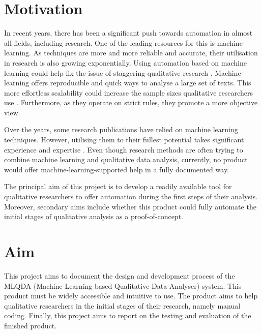 \documentclass{l4proj}
\begin{document}
\section{Motivation}
In recent years, there has been a significant push towards automation in almost all fields, including research. One of the leading resources for this is machine learning. As techniques are more and more reliable and accurate, their utilisation in research is also growing exponentially. Using automation based on machine learning could help fix the issue of staggering qualitative research \citep{chen2018using}. Machine learning offers reproducible and quick ways to analyse a large set of texts. This more effortless scalability could increase the sample sizes qualitative researchers use \citep{crowston2012using}. Furthermore, as they operate on strict rules, they promote a more objective view.

Over the years, some research publications have relied on machine learning techniques. However, utilising them to their fullest potential takes significant experience and expertise \citep{chen2018using, gauthier2022computational}. Even though research methods are often trying to combine machine learning and qualitative data analysis, currently, no product would offer machine-learning-supported help in a fully documented way.

The principal aim of this project is to develop a readily available tool for qualitative researchers to offer automation during the first steps of their analysis. Moreover, secondary aims include whether this product could fully automate the initial stages of qualitative analysis as a proof-of-concept. 

\section{Aim}
This project aims to document the design and development process of the MLQDA (Machine Learning based Qualitative Data Analyser) system. This product must be widely accessible and intuitive to use. The product aims to help qualitative researchers in the initial stages of their research, namely manual coding. Finally, this project aims to report on the testing and evaluation of the finished product.
\end{document}
